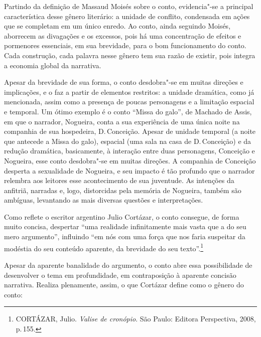 Partindo da definição de Massaud Moisés sobre o conto, evidencia"-se a principal característica desse gênero literário: a unidade de conflito, condensada em ações que se completam em um único enredo. Ao conto, ainda seguindo Moisés, aborrecem as divagações e os excessos, pois há uma concentração de efeitos e pormenores essenciais, em sua brevidade, para o bom funcionamento do conto.
Cada construção, cada palavra nesse gênero tem sua razão de existir, pois integra a economia global da narrativa.

Apesar da brevidade de sua forma, o conto desdobra"-se em muitas direções e implicações, e o faz a partir de elementos restritos: a unidade dramática, como já mencionada, assim como a presença de poucas personagens e a limitação espacial e temporal. Um ótimo exemplo é o conto ``Missa do galo'', de Machado de Assis, em que o narrador, Nogueira, conta a sua experiência de uma única noite na companhia de sua hospedeira, D.\,Conceição. Apesar de unidade temporal (a noite que antecede a Missa do galo), espacial (uma sala na casa de D.\,Conceição) e da redução dramática, basicamente, à interação entre duas personagens, Conceição e Nogueira, esse conto desdobra"-se em muitas direções. A companhia de Conceição desperta a sexualidade de Nogueira, e seu impacto é tão profundo que o narrador relembra aos leitores esse acontecimento de sua juventude. As intenções da anfitriã, narradas e, logo, distorcidas pela memória de Nogueira, também são ambíguas, levantando as mais diversas questões e interpretações.

Como reflete o escritor argentino Julio Cortázar, o conto consegue, de forma muito concisa, despertar ``uma realidade infinitamente mais vasta que a do seu mero argumento'', influindo ``em nós com uma força que nos faria suspeitar da modéstia do seu conteúdo aparente, da brevidade do seu texto''.\footnote{\textsc{CORTÁZAR}, Julio. \textit{Valise de cronópio}. São Paulo: Editora Perspectiva, 2008, p.\,155.}

Apesar da aparente banalidade do argumento, o conto abre essa possibilidade de desenvolver o tema em profundidade, em contraposição à aparente concisão narrativa. Realiza plenamente, assim, o que Cortázar define como o gênero do conto:

